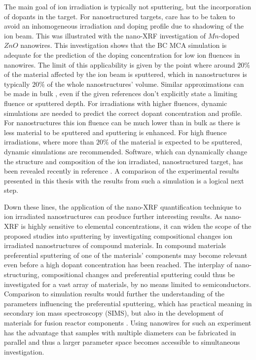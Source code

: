 The main goal of ion irradiation is typically not sputtering, but the incorporation of dopants in the target. For nanostructured targets, care has to be taken to avoid an inhomogeneous irradiation and doping profile due to shadowing of the ion beam. This was illustrated with the nano-XRF investigation of $Mn$-doped $ZnO$ nanowires. This investigation shows that the BC MCA simulation is adequate for the prediction of the doping concentration for low ion fluences in nanowires. The limit of this applicability is given by the point where around $20\%$ of the material affected by the ion beam is sputtered, which in nanostructures is typically $20\%$ of the whole nanostructures' volume. Similar approximations can be made in bulk \cite{moller_tridyn_1984,andersen_computer_1986,moller_tridyn-binary_1988,sigmund_alloy_1993,zaporozchenko_preferential_1995}, even if the given references don't explicitly state a limiting fluence or sputtered depth. For irradiations with higher fluences, dynamic simulations are needed to predict the correct dopant concentration and profile. For nanostructures this ion fluence can be much lower than in bulk as there is less material to be sputtered and sputtering is enhanced. For high fluence irradiations, where more than $20\%$ of the material is expected to be sputtered, dynamic simulations are recommended. Software, which can dynamically change the structure and composition of the ion irradiated, nanostructured target, has been revealed recently in reference \cite{moller_tri3dyn_2014}. A comparison of the experimental results presented in this thesis with the results from such a simulation is a logical next step.

Down these lines, the application of the nano-XRF quantification technique to ion irradiated nanostructures can produce further interesting results. As nano-XRF is highly sensitive to elemental concentrations, it can widen the scope of the proposed studies into sputtering by investigating compositional changes ion irradiated nanostructures of compound materials. In compound materials preferential sputtering of one of the materials' components may become relevant even before a high dopant concentration has been reached. The interplay of nano-structuring, compositional changes and preferential sputtering could thus be investigated for a vast array of materials, by no means limited to semiconductors. Comparison to simulation results would further the understanding of the parameters influencing the preferential sputtering, which has practical meaning in secondary ion mass spectroscopy (SIMS), but also in the development of materials for fusion reactor components \cite{kelly_attempt_1978,roth_sputtering_1990,kenmotsu_effect_2011}. Using nanowires for such an experiment has the advantage that samples with multiple diameters can be fabricated in parallel and thus a larger parameter space becomes accessible to simultaneous investigation.


